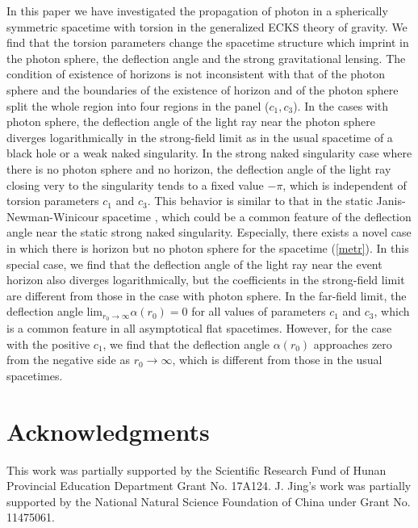 \documentclass[aps,showpacs,preprintnumbers,amsmath,amssymb]{revtex4}
\begin{document}
In this paper we have investigated the propagation of photon in a spherically symmetric spacetime with torsion in the generalized ECKS theory of gravity. We find that the torsion parameters change the spacetime structure which imprint in the photon sphere, the deflection angle and the strong gravitational
lensing. The condition of existence of horizons is not inconsistent with that of the photon sphere and  the boundaries of the existence of horizon and of the photon sphere split the whole region into four regions in the panel ($c_1, c_3$). In the cases with photon sphere,
the deflection angle of the light ray near the photon sphere diverges logarithmically in the strong-field limit as in the usual spacetime of a black hole or a weak naked singularity.
In the strong naked singularity case where there is no photon sphere and no horizon,
the deflection angle of the light ray closing very to the singularity tends to a fixed value $-\pi$, which is independent of torsion parameters $c_1$ and $c_3$.  This behavior is similar to that in the static Janis-Newman-Winicour spacetime \cite{KS4,Gyulchev1}, which could be a common feature of the deflection angle near the static strong naked singularity.
Especially,
there exists a novel case in which there is horizon but no photon sphere for the spacetime (\ref{metr}). In this special case, we find that the deflection angle of the light ray near the event horizon also diverges logarithmically, but the coefficients in the strong-field limit are different from those in the case with photon sphere. In the far-field limit,  the deflection angle $\text{lim}_{r_0\rightarrow\infty}\alpha(r_{0})=0$
for all values of parameters $c_1$ and $c_3$, which is a common feature in all asymptotical flat spacetimes. However, for the case with the positive $c_1$, we find that the deflection angle $\alpha(r_{0})$ approaches zero from the negative side as $r_0\rightarrow\infty$, which is different from those in the usual spacetimes.



\section{\bf Acknowledgments}

This work was partially supported by the Scientific Research
Fund of Hunan Provincial Education Department Grant
No. 17A124. J. Jing's work was partially supported by
the National Natural Science Foundation of China under
Grant No. 11475061.
\end{document}
